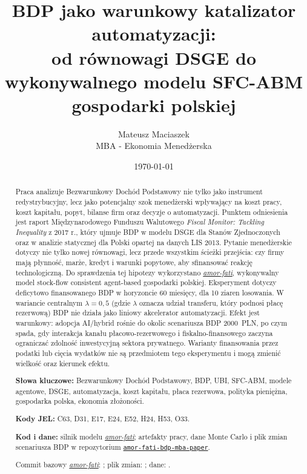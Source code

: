 \documentclass[12pt,a4paper]{article}
\title{BDP jako warunkowy katalizator automatyzacji:\\
od równowagi DSGE do wykonywalnego modelu SFC-ABM gospodarki polskiej}
\author{Mateusz Maciaszek\\MBA - Ekonomia Menedżerska}
\date{\today}
\newcommand{\amor}{\texorpdfstring{\href{https://github.com/boombustgroup/amor-fati}{\textit{amor-fati}}}{amor-fati}}
\newcommand{\paperrepo}{\texorpdfstring{\href{https://github.com/speedcom/amor-fati-bdp-mba-paper}{\texttt{amor-fati-bdp-mba-paper}}}{amor-fati-bdp-mba-paper}}
\begin{document}
\maketitle

\begin{abstract}
Praca analizuje Bezwarunkowy Dochód Podstawowy nie tylko jako instrument redystrybucyjny, lecz jako potencjalny szok menedżerski wpływający na koszt pracy, koszt kapitału, popyt, bilanse firm oraz decyzje o automatyzacji. Punktem odniesienia jest raport Międzynarodowego Funduszu Walutowego \textit{Fiscal Monitor: Tackling Inequality} z 2017 r., który ujmuje BDP w modelu DSGE dla Stanów Zjednoczonych oraz w analizie statycznej dla Polski opartej na danych LIS 2013. Pytanie menedżerskie dotyczy nie tylko nowej równowagi, lecz przede wszystkim ścieżki przejścia: czy firmy mają płynność, marże, kredyt i warunki popytowe, aby sfinansować reakcję technologiczną. Do sprawdzenia tej hipotezy wykorzystano \amor{}, wykonywalny model stock-flow consistent agent-based gospodarki polskiej. Eksperyment dotyczy deficytowo finansowanego BDP w horyzoncie 60 miesięcy, dla 10 ziaren losowania. W wariancie centralnym \(\lambda = 0{,}5\) (gdzie \(\lambda\) oznacza udział transferu, który podnosi płacę rezerwową) BDP nie działa jako liniowy akcelerator automatyzacji. Efekt jest warunkowy: adopcja AI/hybrid rośnie do okolic scenariusza BDP 2000~PLN, po czym spada, gdy interakcja kanału płacowo-rezerwowego i fiskalno-finansowego zaczyna ograniczać zdolność inwestycyjną sektora prywatnego. Warianty finansowania przez podatki lub cięcia wydatków nie są przedmiotem tego eksperymentu i mogą zmienić wielkość oraz kierunek efektu.

\medskip
\noindent\textbf{Słowa kluczowe:} Bezwarunkowy Dochód Podstawowy, BDP, UBI, SFC-ABM, modele agentowe, DSGE, automatyzacja, koszt kapitału, płaca rezerwowa, polityka pieniężna, gospodarka polska, ekonomia złożoności.

\medskip
\noindent\textbf{Kody JEL:} C63, D31, E17, E24, E52, H24, H53, O33.

\medskip
\noindent\textbf{Kod i dane:} silnik modelu \amor{}; artefakty pracy, dane Monte Carlo i plik zmian scenariusza BDP w repozytorium \paperrepo{}.
\newline
{\footnotesize\noindent Commit bazowy \amor{}: ; plik zmian: ; dane: .\par}
\end{abstract}

\clearpage
{}
\tableofcontents
\clearpage













\appendix




\printbibliography
\end{document}
